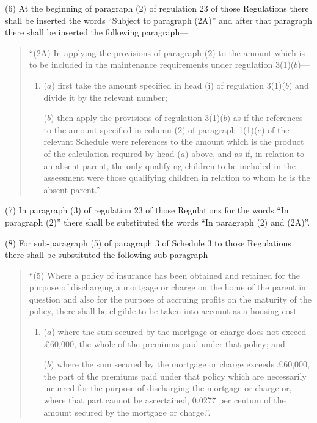 \documentclass[12pt,a4paper]{article}
\begin{document}
(6) At the beginning of paragraph (2) of regulation 23 of those Regulations there shall be inserted the words “Subject to paragraph (2A)” and after that paragraph there shall be inserted the following paragraph—
\begin{quotation}
“(2A) In applying the provisions of paragraph (2) to the amount which is to be included in the maintenance requirements under regulation 3(1)($b$)—
\begin{enumerate}\item[]
($a$) first take the amount specified in head (i) of regulation 3(1)($b$) and divide it by the relevant number;

($b$) then apply the provisions of regulation 3(1)($b$) as if the references to the amount specified in column (2) of paragraph 1(1)($e$) of the relevant Schedule were references to the amount which is the product of the calculation required by head ($a$) above, and as if, in relation to an absent parent, the only qualifying children to be included in the assessment were those qualifying children in relation to whom he is the absent parent.”.
\end{enumerate}
\end{quotation}

(7) In paragraph (3) of regulation 23 of those Regulations for the words “In paragraph (2)” there shall be substituted the words “In paragraph (2) and (2A)”.

(8) For sub-paragraph (5) of paragraph 3 of Schedule 3 to those Regulations there shall be substituted the following sub-paragraph—
\begin{quotation}
“(5) Where a policy of insurance has been obtained and retained for the purpose of discharging a mortgage or charge on the home of the parent in question and also for the purpose of accruing profits on the maturity of the policy, there shall be eligible to be taken into account as a housing cost—
\begin{enumerate}\item[]
($a$) where the sum secured by the mortgage or charge does not exceed £60,000, the whole of the premiums paid under that policy; and

($b$) where the sum secured by the mortgage or charge exceeds £60,000, the part of the premiums paid under that policy which are necessarily incurred for the purpose of discharging the mortgage or charge or, where that part cannot be ascertained, 0.0277 per centum of the amount secured by the mortgage or charge.”.
\end{enumerate}
\end{quotation}
\end{document}
